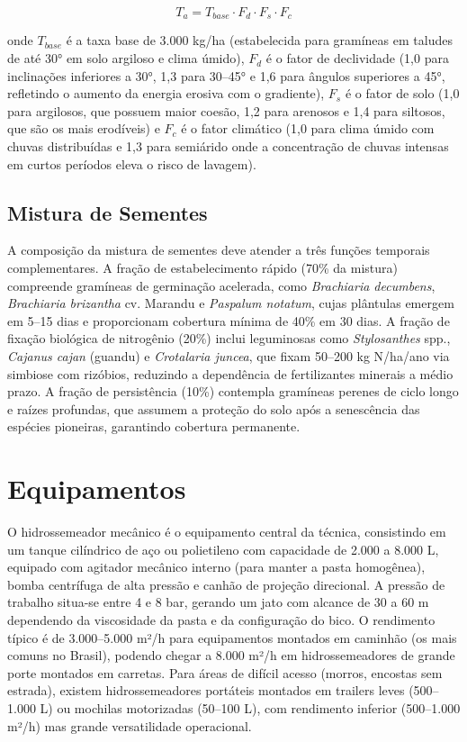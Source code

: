 \documentclass[
  portuguese,
  11pt,
  a4paper,
  open=any]{scrbook}
\begin{document}
\[
T_a = T_{base} \cdot F_d \cdot F_s \cdot F_c
\]

onde \(T_{base}\) é a taxa base de 3.000 kg/ha (estabelecida para
gramíneas em taludes de até 30° em solo argiloso e clima úmido), \(F_d\)
é o fator de declividade (1,0 para inclinações inferiores a 30°, 1,3
para 30--45° e 1,6 para ângulos superiores a 45°, refletindo o aumento
da energia erosiva com o gradiente), \(F_s\) é o fator de solo (1,0 para
argilosos, que possuem maior coesão, 1,2 para arenosos e 1,4 para
siltosos, que são os mais erodíveis) e \(F_c\) é o fator climático (1,0
para clima úmido com chuvas distribuídas e 1,3 para semiárido onde a
concentração de chuvas intensas em curtos períodos eleva o risco de
lavagem).

\subsection{Mistura de Sementes}\label{mistura-de-sementes}

A composição da mistura de sementes deve atender a três funções
temporais complementares. A fração de estabelecimento rápido (70\% da
mistura) compreende gramíneas de germinação acelerada, como
\emph{Brachiaria decumbens}, \emph{Brachiaria brizantha} cv. Marandu e
\emph{Paspalum notatum}, cujas plântulas emergem em 5--15 dias e
proporcionam cobertura mínima de 40\% em 30 dias. A fração de fixação
biológica de nitrogênio (20\%) inclui leguminosas como
\emph{Stylosanthes} spp., \emph{Cajanus cajan} (guandu) e
\emph{Crotalaria juncea}, que fixam 50--200 kg N/ha/ano via simbiose com
rizóbios, reduzindo a dependência de fertilizantes minerais a médio
prazo. A fração de persistência (10\%) contempla gramíneas perenes de
ciclo longo e raízes profundas, que assumem a proteção do solo após a
senescência das espécies pioneiras, garantindo cobertura permanente.

\section{Equipamentos}\label{equipamentos}

O hidrossemeador mecânico é o equipamento central da técnica,
consistindo em um tanque cilíndrico de aço ou polietileno com capacidade
de 2.000 a 8.000 L, equipado com agitador mecânico interno (para manter
a pasta homogênea), bomba centrífuga de alta pressão e canhão de
projeção direcional. A pressão de trabalho situa-se entre 4 e 8 bar,
gerando um jato com alcance de 30 a 60 m dependendo da viscosidade da
pasta e da configuração do bico. O rendimento típico é de 3.000--5.000
m²/h para equipamentos montados em caminhão (os mais comuns no Brasil),
podendo chegar a 8.000 m²/h em hidrossemeadores de grande porte montados
em carretas. Para áreas de difícil acesso (morros, encostas sem
estrada), existem hidrossemeadores portáteis montados em trailers leves
(500--1.000 L) ou mochilas motorizadas (50--100 L), com rendimento
inferior (500--1.000 m²/h) mas grande versatilidade operacional.
\end{document}
